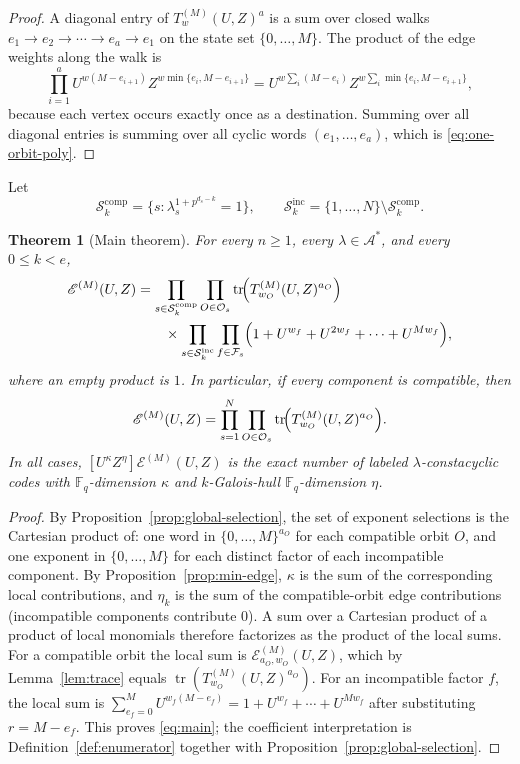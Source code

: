 \documentclass[11pt,a4paper]{article}
\newcommand{\F}{\mathbb F}
\newcommand{\A}{\mathcal A}
\newcommand{\Fs}{\mathcal F_s}
\newcommand{\Os}{\mathcal O_s}
\newcommand{\Epoly}{\mathscr E}
\numberwithin{equation}{section}
\theoremstyle{plain}
\newtheorem{theorem}{Theorem}[section]
\theoremstyle{definition}
\theoremstyle{remark}
\begin{document}
\begin{proof}
A diagonal entry of $T^{(M)}_w(U,Z)^a$ is a sum over closed walks
$e_1\to e_2\to\cdots\to e_a\to e_1$ on the state set $\{0,\ldots,M\}$.
The product of the edge weights along the walk is
\[
\prod_{i=1}^{a}U^{w(M-e_{i+1})}Z^{w\min\{e_i,M-e_{i+1}\}}
 =U^{w\sum_i(M-e_i)}Z^{w\sum_i\min\{e_i,M-e_{i+1}\}},
\]
because each vertex occurs exactly once as a destination.  Summing over all
diagonal entries is summing over all cyclic words $(e_1,\ldots,e_a)$, which is
\eqref{eq:one-orbit-poly}.
\end{proof}

Let
\[
\mathcal{S}_k^{\mathrm{comp}}
 =\{s:\lambda_s^{1+p^{d_s-k}}=1\},
\qquad
\mathcal{S}_k^{\mathrm{inc}}=\{1,\ldots,N\}\setminus
                               \mathcal{S}_k^{\mathrm{comp}} .
\]

\begin{theorem}[Main theorem]\label{thm:main}
For every $n\geq1$, every $\lambda\in\A^\ast$, and every $0\leq k<e$,
\begin{align}
\Epoly^{(M)}(U,Z)
&=\prod_{s\in\mathcal{S}_k^{\mathrm{comp}}}
   \prod_{O\in\Os}
     \operatorname{tr}\!\Bigl(T^{(M)}_{w_O}(U,Z)^{a_O}\Bigr)
   \notag\\
&\qquad\times
  \prod_{s\in\mathcal{S}_k^{\mathrm{inc}}}
   \prod_{f\in\Fs}
     \Bigl(1+U^{w_f}+U^{2w_f}+\cdots+U^{Mw_f}\Bigr),
\label{eq:main}
\end{align}
where an empty product is $1$.  In particular, if every component is
compatible, then
\[
\Epoly^{(M)}(U,Z)
 =\prod_{s=1}^{N}\prod_{O\in\Os}
   \operatorname{tr}\!\Bigl(T^{(M)}_{w_O}(U,Z)^{a_O}\Bigr).
\]
In all cases, $[U^\kappa Z^\eta]\Epoly^{(M)}(U,Z)$ is the exact number of labeled
$\lambda$-constacyclic codes with $\F_q$-dimension $\kappa$ and
$k$-Galois-hull $\F_q$-dimension $\eta$.
\end{theorem}

\begin{proof}
By Proposition~\ref{prop:global-selection}, the set of exponent selections is
the Cartesian product of: one word in $\{0,\ldots,M\}^{a_O}$ for each
compatible orbit $O$, and one exponent in $\{0,\ldots,M\}$ for each distinct
factor of each incompatible component.  By
Proposition~\ref{prop:min-edge}, $\kappa$ is the sum of the corresponding
local contributions, and $\eta_k$ is the sum of the compatible-orbit edge
contributions (incompatible components contribute $0$).  A sum over a Cartesian
product of a product of local monomials therefore factorizes as the product of
the local sums.  For a compatible orbit the local sum is
$\Epoly_{a_O,w_O}^{(M)}(U,Z)$, which by Lemma~\ref{lem:trace} equals
$\operatorname{tr}(T^{(M)}_{w_O}(U,Z)^{a_O})$.  For an incompatible factor
$f$, the local sum is
$\sum_{e_f=0}^{M}U^{w_f(M-e_f)}
 =1+U^{w_f}+\cdots+U^{Mw_f}$ after substituting $r=M-e_f$.  This proves
\eqref{eq:main}; the coefficient interpretation is
Definition~\ref{def:enumerator} together with
Proposition~\ref{prop:global-selection}.
\end{proof}
\end{document}
